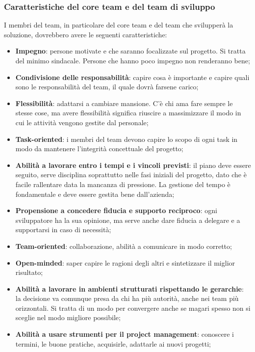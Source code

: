 \subsubsection{Caratteristiche del core team e del team di sviluppo}
I membri del team, in particolare del core team e del team che svilupperà la
soluzione, dovrebbero avere le seguenti caratteristiche:
\begin{itemize}
	\item \textbf{Impegno}: persone motivate e che saranno focalizzate sul progetto. Si tratta del minimo sindacale. Persone che hanno poco impegno non renderanno bene;
	\item \textbf{Condivisione delle responsabilità}: capire cosa è importante e capire quali sono le responsabilità del team, il quale dovrà farsene carico;
	\item \textbf{Flessibilità}: adattarsi a cambiare mansione. C'è chi ama fare sempre le stesse cose, ma avere flessibilità significa riuscire a massimizzare il modo in cui le attività vengono gestite dal personale;
	\item \textbf{Task-oriented}: i membri del team devono capire lo scopo di ogni task in modo da mantenere l'integrità concettuale del progetto;
	\item \textbf{Abilità a lavorare entro i tempi e i vincoli previsti}: il piano deve essere seguito, serve disciplina soprattutto nelle fasi iniziali del progetto, dato che è facile rallentare data la mancanza di pressione. La gestione del tempo è fondamentale e deve essere gestita bene dall'azienda;
	\item \textbf{Propensione a concedere fiducia e supporto reciproco}: ogni sviluppatore ha la sua opinione, ma serve anche dare fiducia a delegare e a supportarsi in caso di necessità;
	\item \textbf{Team-oriented}: collaborazione, abilità a comunicare in modo corretto;
	\item \textbf{Open-minded}: saper capire le ragioni degli altri e sintetizzare il miglior risultato;
	\item \textbf{Abilità a lavorare in ambienti strutturati rispettando le gerarchie}: la decisione va comunque presa da chi ha più autorità, anche nei team più orizzontali. Si tratta di un modo per convergere anche se magari spesso non si sceglie nel modo migliore possibile;
	\item \textbf{Abilità a usare strumenti per il project management}: conoscere i termini, le buone pratiche, acquisirle, adattarle ai nuovi progetti;
\end{itemize}

